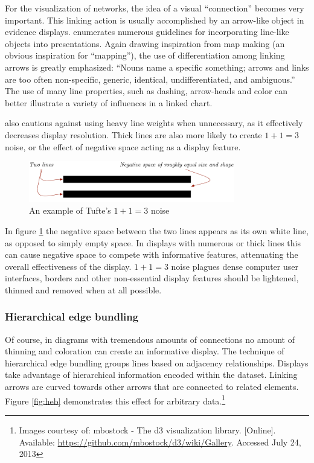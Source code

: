For the visualization of networks, the idea of a visual ``connection'' becomes very important. This linking action is usually accomplished by an arrow-like object in evidence displays.  enumerates numerous guidelines for incorporating line-like objects into presentations. Again drawing inspiration from map making (an obvious inspiration for ``mapping''), the use of differentiation among linking arrows is greatly emphasized: ``Nouns name a specific something; arrows and links are too often non-specific, generic, identical, undifferentiated, and ambiguous.'' The use of many line properties, such as dashing, arrow-heads and color can better illustrate a variety of influences in a linked chart.

 also cautions against using heavy line weights when unnecessary, as it effectively decreases display resolution. Thick lines are also more likely to create $1 + 1 = 3$ noise, or the effect of negative space acting as a display feature.

\begin{figure}[ht]
\centering
	\includegraphics[width=0.8\textwidth]{figures/1and1equals3}
\caption{An example of Tufte's $1 + 1 = 3$ noise}
\label{fig:1and1equals3}
\end{figure}

In figure \ref{fig:1and1equals3} the negative space between the two lines appears as its own white line, as opposed to simply empty space. In displays with numerous or thick lines this can cause negative space to compete with informative features, attenuating the overall effectiveness of the display. $1 + 1 = 3$ noise plagues dense computer user interfaces, borders and other non-essential display features should be lightened, thinned and removed when at all possible.

	\subsubsection{Hierarchical edge bundling}

Of course, in diagrams with tremendous amounts of connections no amount of thinning and coloration can create an informative display. The technique of hierarchical edge bundling \cite{HEB} groups lines based on adjacency relationships. Displays take advantage of hierarchical information encoded within the dataset. Linking arrows are curved towards other arrows that are connected to related elements. Figure \ref{fig:heb} demonstrates this effect for arbitrary data.\footnote{Images courtesy of: mbostock - The d3 visualization library. [Online]. Available: \url{https://github.com/mbostock/d3/wiki/Gallery}. Accessed July 24, 2013} 

